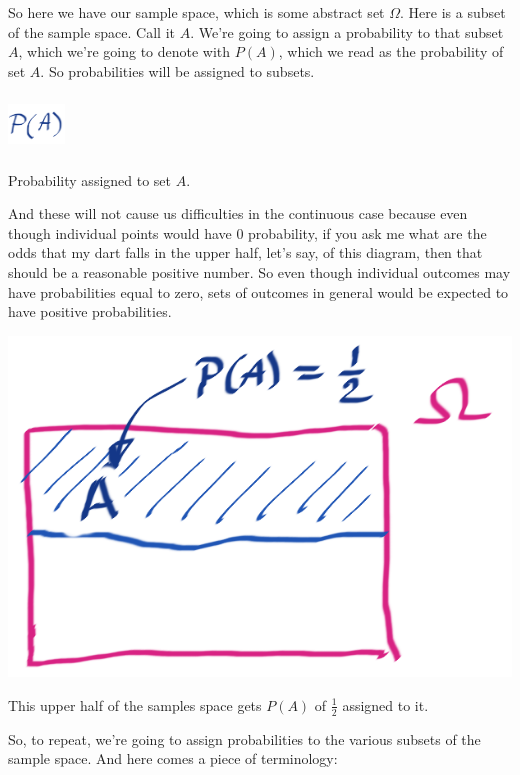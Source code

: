 \documentclass{tufte-handout}
\begin{document}
So here we have our sample space, which is some abstract set $\Omega$. Here is a subset of the sample
space. Call it $A$. We're going to assign a probability to that subset $A$, which we're going to denote
with $P(A)$, which we read as the probability of set $A$. So probabilities will be assigned to subsets.

\begin{marginfigure}
  \includegraphics[width=1.5cm, height=1.5cm]{ProbA}
  \caption{Probability assigned to set $A$.}
\end{marginfigure}

And these will not cause us difficulties in the continuous case because even though individual points
would have $0$ probability, if you ask me what are the odds that my dart falls in the upper half, let's say,
of this diagram, then that should be a reasonable positive number. So even though individual outcomes
may have probabilities equal to zero, sets of outcomes in general would be expected to have positive probabilities.

\begin{marginfigure}
  \includegraphics[width=\linewidth]{UpperHalf}
  \caption{This upper half of the samples space gets $P(A)$ of $\frac{1}{2}$ assigned to it.}
\end{marginfigure}


So, to repeat, we're going to assign probabilities to the various subsets of the sample space. And
here comes a piece of terminology: 
\end{document}
